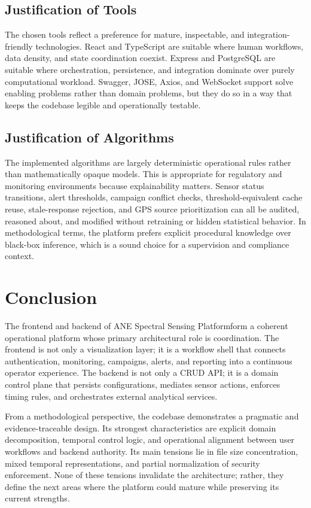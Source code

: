 \documentclass[11pt,a4paper]{article}
\newcommand{\project}{ANE Spectral Sensing Platform}
\begin{document}
\subsection{Justification of Tools}
The chosen tools reflect a preference for mature, inspectable, and integration-friendly technologies. React and TypeScript are suitable where human workflows, data density, and state coordination coexist. Express and PostgreSQL are suitable where orchestration, persistence, and integration dominate over purely computational workload. Swagger, JOSE, Axios, and WebSocket support solve enabling problems rather than domain problems, but they do so in a way that keeps the codebase legible and operationally testable.

\subsection{Justification of Algorithms}
The implemented algorithms are largely deterministic operational rules rather than mathematically opaque models. This is appropriate for regulatory and monitoring environments because explainability matters. Sensor status transitions, alert thresholds, campaign conflict checks, threshold-equivalent cache reuse, stale-response rejection, and GPS source prioritization can all be audited, reasoned about, and modified without retraining or hidden statistical behavior. In methodological terms, the platform prefers explicit procedural knowledge over black-box inference, which is a sound choice for a supervision and compliance context.

\section{Conclusion}
The frontend and backend of \project form a coherent operational platform whose primary architectural role is coordination. The frontend is not only a visualization layer; it is a workflow shell that connects authentication, monitoring, campaigns, alerts, and reporting into a continuous operator experience. The backend is not only a CRUD API; it is a domain control plane that persists configurations, mediates sensor actions, enforces timing rules, and orchestrates external analytical services.

From a methodological perspective, the codebase demonstrates a pragmatic and evidence-traceable design. Its strongest characteristics are explicit domain decomposition, temporal control logic, and operational alignment between user workflows and backend authority. Its main tensions lie in file size concentration, mixed temporal representations, and partial normalization of security enforcement. None of these tensions invalidate the architecture; rather, they define the next areas where the platform could mature while preserving its current strengths.
\end{document}
